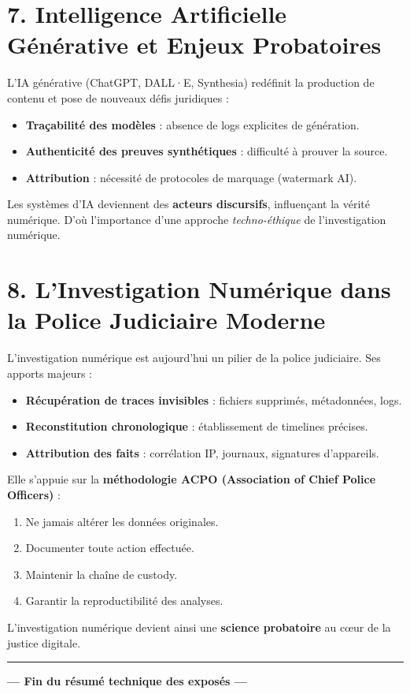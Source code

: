 \documentclass[12pt,a4paper]{article}
\begin{document}
\bigskip
\section*{7. Intelligence Artificielle Générative et Enjeux Probatoires}
L’IA générative (ChatGPT, DALL·E, Synthesia) redéfinit la production de contenu et pose de nouveaux défis juridiques :
\begin{itemize}[noitemsep]
  \item \textbf{Traçabilité des modèles} : absence de logs explicites de génération.
  \item \textbf{Authenticité des preuves synthétiques} : difficulté à prouver la source.
  \item \textbf{Attribution} : nécessité de protocoles de marquage (watermark AI).
\end{itemize}
Les systèmes d’IA deviennent des \textbf{acteurs discursifs}, influençant la vérité numérique. D’où l’importance d’une approche \emph{techno-éthique} de l’investigation numérique.

\bigskip
\section*{8. L’Investigation Numérique dans la Police Judiciaire Moderne}
L’investigation numérique est aujourd’hui un pilier de la police judiciaire. Ses apports majeurs :
\begin{itemize}[noitemsep]
  \item \textbf{Récupération de traces invisibles} : fichiers supprimés, métadonnées, logs.
  \item \textbf{Reconstitution chronologique} : établissement de timelines précises.
  \item \textbf{Attribution des faits} : corrélation IP, journaux, signatures d’appareils.
\end{itemize}
Elle s’appuie sur la \textbf{méthodologie ACPO (Association of Chief Police Officers)} :
\begin{enumerate}[noitemsep]
  \item Ne jamais altérer les données originales.
  \item Documenter toute action effectuée.
  \item Maintenir la chaîne de custody.
  \item Garantir la reproductibilité des analyses.
\end{enumerate}
L’investigation numérique devient ainsi une \textbf{science probatoire} au cœur de la justice digitale.

\bigskip
\hrule
\bigskip

\begin{center}
\textbf{--- Fin du résumé technique des exposés ---}
\end{center}
\end{document}
